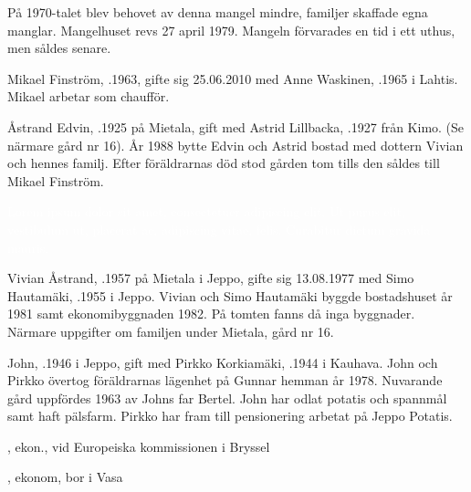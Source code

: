 På 1970-talet blev behovet av denna mangel mindre, familjer skaffade egna manglar. Mangelhuset revs 27 april 1979. Mangeln förvarades en tid i ett uthus, men såldes senare.



%



%
Mikael Finström, .1963, gifte sig 25.06.2010 med Anne Waskinen, .1965 i Lahtis. Mikael arbetar som chaufför.\jhvspace{}



%
Åstrand Edvin, .1925 på Mietala, gift med Astrid Lillbacka, .1927 från Kimo. (Se närmare gård nr 16). År 1988 bytte Edvin och Astrid bostad med dottern Vivian och hennes familj. Efter föräldrarnas död stod gården tom tills den såldes till Mikael Finström.

\textcolor{white}{Lorem ipsum dolor sit amet, consectetuer adipiscing elit. Ut purus elit, vestibulum ut, placerat ac, adipiscing vitae, felis. Curabitur dictum gravida mauris.} %

%
Vivian Åstrand, .1957  på Mietala i Jeppo, gifte sig 13.08.1977 med Simo Hautamäki, .1955 i Jeppo. Vivian och Simo Hautamäki byggde bostadshuset år 1981 samt ekonomibyggnaden 1982. På tomten fanns då inga byggnader. Närmare uppgifter om familjen under Mietala, gård nr 16.



%



%
John, .1946 i Jeppo, gift med Pirkko Korkiamäki, .1944 i Kauhava. John och Pirkko övertog föräldrarnas lägenhet på Gunnar hemman år 1978. Nuvarande gård uppfördes 1963 av Johns far Bertel. John har odlat potatis och spannmål samt haft pälsfarm. Pirkko har fram till pensionering arbetat på Jeppo Potatis.
\begin{jhchildren}
  \item {}, ekon., vid Europeiska kommissionen i Bryssel
  \item {}, ekonom, bor i Vasa
\end{jhchildren}


